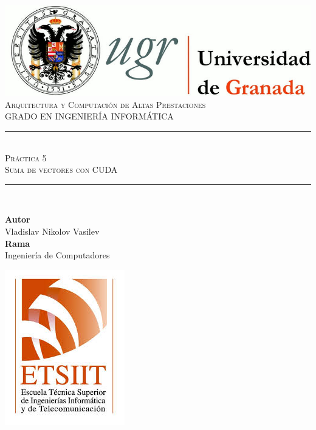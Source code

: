 \documentclass[11pt,a4paper]{article}
\newcommand{\asignatura}{Arquitectura y Computación de Altas Prestaciones}
\newcommand{\autor}{Vladislav Nikolov Vasilev}
\newcommand{\titulo}{Práctica 5}
\newcommand{\subtitulo}{Suma de vectores con CUDA}
\newcommand{\rama}{Ingeniería de Computadores}
\begin{document}

\begin{titlepage}

\begin{minipage}{\textwidth}

\centering

\includegraphics[scale=0.3]{img/logo_ugr.jpg}\\[1cm]

\textsc{\Large \asignatura{}\\[0.2cm]}
\textsc{GRADO EN INGENIERÍA INFORMÁTICA}\\[1cm]

\noindent\rule[-1ex]{\textwidth}{1pt}\\[1.5ex]
\textsc{{\Huge \titulo\\[0.5ex]}}
\textsc{{\Large \subtitulo\\}}
\noindent\rule[-1ex]{\textwidth}{2pt}\\[3.5ex]

\end{minipage}

\vspace{0.7cm}

\begin{minipage}{\textwidth}

\centering

\textbf{Autor}\\ {\autor{}}\\[2.5ex]
\textbf{Rama}\\ {\rama}\\[2.5ex]
\vspace{0.3cm}

\includegraphics[scale=0.3]{img/etsiit.jpeg}


\end{minipage}
\end{titlepage}
\end{document}
